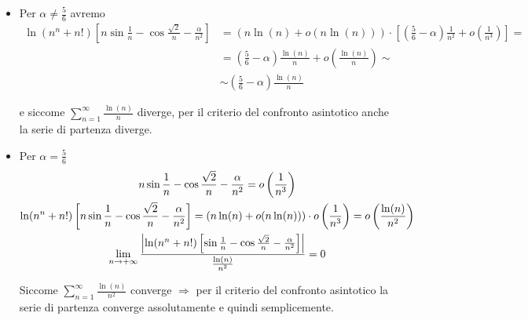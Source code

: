 \begin{exbar}
\begin{example}
	\begin{itemize}
	\item Per $\alpha \neq \frac{5}{6}$ avremo
	\begin{align*}
		\ln(n^n + n!) \left[ n \sin{\frac{1} {n}} - \cos{\frac{\sqrt{2}} {n}} - \frac{\alpha} {n^2} \right] 
		&= \left( n\ln(n) + o(n\ln(n)) \right) \cdot \left[ \left(\frac{5} {6} - \alpha \right) \frac{1} {n^2} + o \left( \frac{1} {n^3} \right) \right] =
		\\
		&= \left( \frac{5}{6} - \alpha \right)  \frac{\ln(n)}{n} + o \left( \frac{\ln(n)}{n} \right) \sim
		\\
		&\sim \left(\frac{5} {6} - \alpha \right) \frac{\ln(n)} {n}
	\end{align*}
	
	e siccome $\sum_{n=1}^{\infty} \frac{\ln(n)}{n}$ diverge, per il criterio del confronto asintotico anche la serie di partenza diverge.
	
	\item Per $\alpha= \frac{5}{6}$
	\begin{gather*}
		n \sin{\frac{1} {n}} - \cos{\frac{\sqrt{2}} {n}} - \frac{\alpha} {n^2} = o \left( \frac{1} {n^3} \right)
		\\
		\ln(n^n + n!) \left[ n \sin{\frac{1} {n}} - \cos{\frac{\sqrt{2}} {n}} - \frac{\alpha} {n^2} \right] = (n\ln(n) + o(n\ln(n))) \cdot o \left( \frac{1} {n^3} \right) = o \left( \frac{\ln(n)} {n^2} \right)
		\\
		\lim_{n \rightarrow +\infty} \frac{ \left| \ln(n^n + n!) \left[ \sin{\frac{1} {n}} - \cos{\frac{\sqrt{2}} {n}} - \frac{\alpha} {n^2} \right] \right|} {\frac{\ln(n)} {n^2}} = 0
	\end{gather*}
	
	Siccome $\sum_{n=1}^{\infty} \frac{\ln(n)}{n^2}$ converge $\Rightarrow$ per il criterio del confronto asintotico la serie di partenza converge assolutamente e quindi semplicemente.
	\end{itemize}
\end{example}
\end{exbar}

